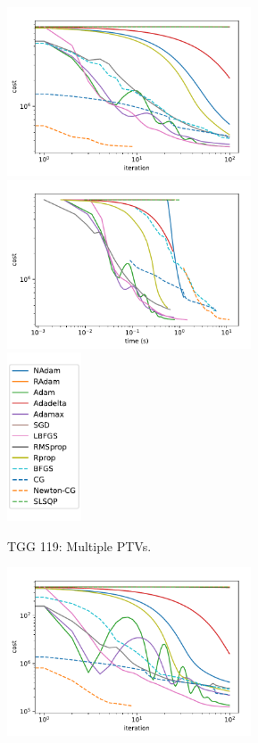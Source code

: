 \begin{figure}
	\centering
	\begin{subfigure}{\textwidth}
		\centering
		\includegraphics[height=5cm]{optimizers_comparison/TGG119Multi-iter.pdf}
		\includegraphics[height=5cm]{optimizers_comparison/TGG119Multi-time.pdf}
		\includegraphics[height=5cm]{optimizers_comparison/legend.pdf}
		\caption{TGG 119: Multiple PTVs.}
		\label{fig:TGG119_Multi}
	\end{subfigure}
	\begin{subfigure}{\textwidth}
		\centering
		\includegraphics[height=5cm]{optimizers_comparison/TGG119HN-iter.pdf}

\end{subfigure}
\end{figure}
